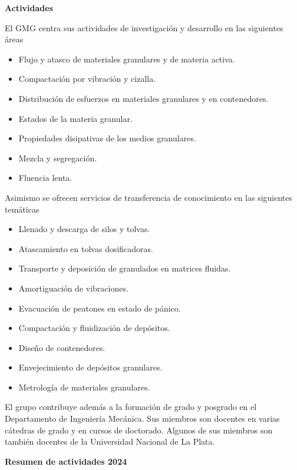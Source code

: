 \documentclass[a4paper,11pt,twoside,final,titlepage,onecolumn,openright]{report}
\begin{document}
\vspace{0.5cm}
{\bf Actividades}
\vspace{0.5cm}

El GMG centra sus actividades de investigación y desarrollo en las siguientes áreas

\begin{itemize}
 \item Flujo y atasco de materiales granulares y de materia activa.
 \item Compactación por vibración y cizalla.
 \item Distribución de esfuerzos en materiales granulares y en contenedores.
 \item Estados de la materia granular.
 \item Propiedades disipativas de los medios granulares.
 \item Mezcla y segregación.
 \item Fluencia lenta.
\end{itemize}

Asimismo se ofrecen servicios de transferencia de conocimiento en las siguientes temáticas

\begin{itemize}
 \item Llenado y descarga de silos y tolvas.
 \item Atascamiento en tolvas dosificadoras.
 \item Transporte y deposición de granulados en matrices fluidas.
 \item Amortiguación de vibraciones.
 \item Evacuación de peatones en estado de pánico.
 \item Compactación y fluidización de depósitos.
 \item Diseño de contenedores.
 \item Envejecimiento de depósitos granulares.
 \item Metrología de materiales granulares.
\end{itemize}

El grupo contribuye además a la formación de grado y posgrado en el Departamento de Ingeniería Mecánica. Sus miembros son docentes en varias cátedras de grado y en cursos de doctorado. Algunos de sus miembros son también docentes de la Universidad Nacional de La Plata.

\vspace{0.5cm}

{\bf Resumen de actividades 2024}
\end{document}
